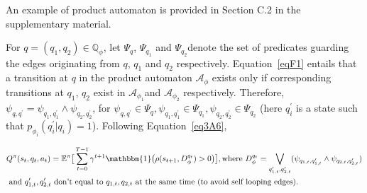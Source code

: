 \documentclass{article}
\newtheorem{example}{Example}
\newcommand{\Event}{\diamondsuit}
\begin{document}
\noindent An example of product automaton is provided in Section C.2 in the supplementary material.


For $q=(q_1, q_2) \in \mathbb{Q}_\phi$, let $\Psi_q$,  $\Psi_{q_1}$ and $\Psi_{q_2}$denote the set of predicates guarding the edges originating from $q$, $q_1$ and $q_2$ respectively. Equation~\eqref{eqF1} entails that a transition at $q$ in the product automaton $\mathcal{A}_\phi$ exists only if corresponding transitions at $q_1$, $q_2$ exist in $\mathcal{A}_{\phi_1}$and $\mathcal{A}_{\phi_2}$ respectively. Therefore, $\psi_{q,q^\prime} = \psi_{q_1, q_1^\prime} \wedge \psi_{q_2, q_2^\prime}$, for  $\psi_{q,q^\prime}\in\Psi_q, \psi_{q_1, q_1^\prime}\in\Psi_{q_1}, \psi_{q_2, q_2^\prime}\in\Psi_{q_2}$ (here $q_i^\prime$ is a state such that $p_{\phi_i}(q_i^\prime | q_i) = 1$).  Following Equation~\eqref{eq3A6}, 

\begin{equation}\label{eq3C3}
\begin{split}
&Q^\pi(s_t, q_t, a_t) = \mathbb{E}^\pi\big [ \sum^{T-1}_{t=0} \gamma^{t+1}\mathbbm{1}\big (\rho(s_{t+1}, D^{q_t}_\phi)>0\big)  \big], \textrm{where }  D^{q_t}_\phi = \bigvee_{q_{1,t}^\prime, q_{2,t}^\prime} ( \psi_{q_{1,t}, q_{1,t}^\prime} \wedge \psi_{q_{2,t}, q_{2,t}^\prime}) \\ 
& \textrm{ and } q_{1,t}^\prime, q_{2,t}^\prime \textrm{ don't equal to } q_{1,t}, q_{2,t} \textrm{ at the same time (to avoid self looping edges)}.
\end{split}
\end{equation}
\end{document}
